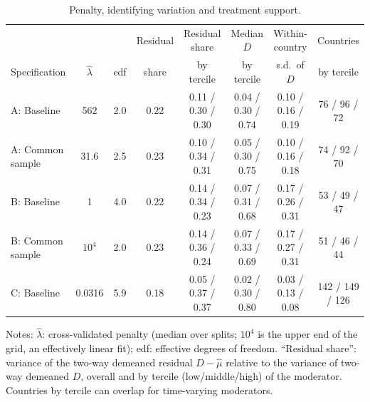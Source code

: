 \documentclass[preprint,12pt,authoryear]{elsarticle}
\begin{document}
\begin{table}[!ht]
\centering
\begin{threeparttable}
\caption{Penalty, identifying variation and treatment support.}\label{tab:diag}
\scriptsize
\setlength{\tabcolsep}{3pt}
\begin{tabular}{lccccccc}
\toprule
 & & & Residual & Residual share & Median $D$ & Within-country & Countries\\
Specification & $\hat\lambda$ & edf & share & by tercile & by tercile & s.d.\ of $D$ & by tercile\\
\midrule
A: Baseline & 562 & 2.0 & 0.22 & 0.11 / 0.30 / 0.30 & 0.04 / 0.30 / 0.74 & 0.10 / 0.16 / 0.19 & 76 / 96 / 72\\
A: Common sample & 31.6 & 2.5 & 0.23 & 0.10 / 0.34 / 0.31 & 0.05 / 0.30 / 0.75 & 0.10 / 0.16 / 0.18 & 74 / 92 / 70\\
B: Baseline & 1 & 4.0 & 0.22 & 0.14 / 0.34 / 0.23 & 0.07 / 0.31 / 0.68 & 0.17 / 0.26 / 0.31 & 53 / 49 / 47\\
B: Common sample & $10^{4}$ & 2.0 & 0.23 & 0.14 / 0.36 / 0.24 & 0.07 / 0.33 / 0.69 & 0.17 / 0.27 / 0.31 & 51 / 46 / 44\\
C: Baseline & 0.0316 & 5.9 & 0.18 & 0.05 / 0.37 / 0.37 & 0.02 / 0.30 / 0.80 & 0.03 / 0.13 / 0.08 & 142 / 149 / 126\\
\bottomrule
\end{tabular}
\begin{tablenotes}\scriptsize
\item Notes: $\hat\lambda$: cross-validated penalty (median over splits; $10^4$ is the upper end of the grid, an effectively linear fit); edf: effective degrees of freedom. ``Residual share'': variance of the two-way demeaned residual $D-\hat\mu$ relative to the variance of two-way demeaned $D$, overall and by tercile (low/middle/high) of the moderator. Countries by tercile can overlap for time-varying moderators.
\end{tablenotes}
\end{threeparttable}
\end{table}
\end{document}
